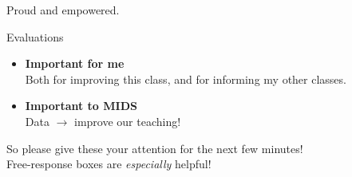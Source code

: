 \documentclass[11pt]{beamer}
\begin{document}
\begin{frame}[c]{}
\centering
     \alert{Proud} and \alert{empowered}. 
  \end{frame}

\begin{frame}[c]{Evaluations}
\begin{itemize}
  \pause \item \textbf{Important for me} \\
  \pause Both for improving this class, and for informing my other classes.
  \pause \item \textbf{Important to MIDS} \\
  Data $\rightarrow$ improve our teaching!
\end{itemize}
\pause So please give these your attention for the next few minutes! \\
\pause Free-response boxes are \emph{especially} helpful!
\end{frame}
\end{document}
